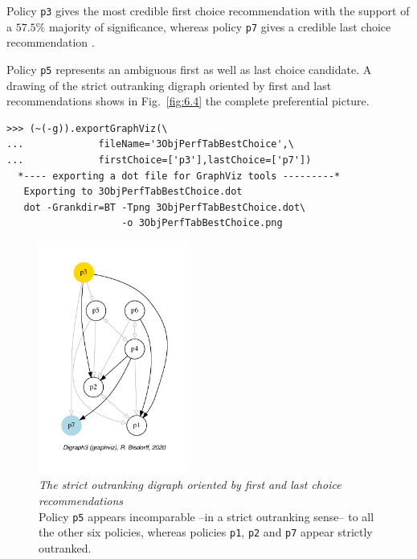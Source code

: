 Policy \texttt{p3} gives the most credible first choice recommendation with the support of a $57.5\%$ majority of significance, whereas policy \texttt{p7} gives a credible last choice recommendation .

Policy \texttt{p5} represents an ambiguous first as well as last choice candidate. A drawing of the strict outranking digraph oriented by first and last recommendations shows in Fig.~\vref{fig:6.4} the complete preferential picture.
\begin{lstlisting}
>>> (~(-g)).exportGraphViz(\
...             fileName='3ObjPerfTabBestChoice',\
...             firstChoice=['p3'],lastChoice=['p7'])
  *---- exporting a dot file for GraphViz tools ---------*
   Exporting to 3ObjPerfTabBestChoice.dot
   dot -Grankdir=BT -Tpng 3ObjPerfTabBestChoice.dot\
                    -o 3ObjPerfTabBestChoice.png
\end{lstlisting}
\begin{figure}[ht]
\sidecaption[t]
\includegraphics[width=5cm]{Figures/6-4-3ObjPerfTabBestChoice.pdf}
\caption[The strict outranking digraph oriented by first and last choices]{\emph{The strict outranking digraph oriented by first and last choice recommendations}\\ Policy \texttt{p5} appears incomparable --in a strict outranking sense-- to all the other six policies, whereas policies \texttt{p1}, \texttt{p2} and \texttt{p7} appear strictly outranked.}
\label{fig:6.4}       %
\end{figure}

